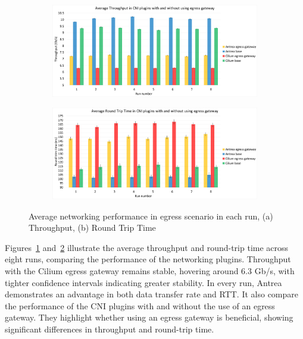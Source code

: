 \begin{figure}[H]
    \centering
    \begin{subfigure}[b]{1\textwidth}
        \includegraphics[width=\textwidth]{plots/egress/throughput_all.png}
        \caption{}
        \label{fig:throughput_all}
    \end{subfigure}
    \begin{subfigure}[b]{1\textwidth}
        \includegraphics[width=\textwidth]{plots/egress/rtt_all.png}
        \caption{}
        \label{fig:rtt_all}
    \end{subfigure}
    
    \caption{Average networking performance in egress scenario in each run, (a) Throughput, (b) Round Trip Time}
    \label{fig:networking_avg_all}
\end{figure}




Figures~\ref{fig:throughput_all} and~\ref{fig:rtt_all} illustrate the average throughput and round-trip time across eight runs, comparing the performance of the networking plugins. Throughput with the Cilium egress gateway remains stable, hovering around 6.3 Gb/s, with tighter confidence intervals indicating greater stability. In every run, Antrea demonstrates an advantage in both data transfer rate and RTT. It also compare the performance of the CNI plugins with and without the use of an egress gateway. They highlight whether using an egress gateway is beneficial, showing significant differences in throughput and round-trip time.


